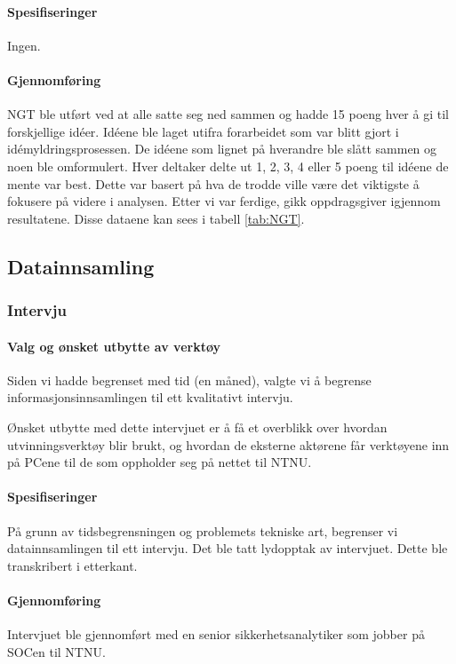 \paragraph{Spesifiseringer}
Ingen.

\paragraph{Gjennomføring}
NGT ble utført ved at alle satte seg ned sammen og hadde 15 poeng hver å gi til forskjellige idéer. Idéene ble laget utifra forarbeidet som var blitt gjort i idémyldringsprosessen. De idéene som lignet på hverandre ble slått sammen og noen ble omformulert. Hver deltaker delte ut 1, 2, 3, 4 eller 5 poeng til idéene de mente var best. Dette var basert på hva de trodde ville være det viktigste å fokusere på videre i analysen. Etter vi var ferdige, gikk oppdragsgiver igjennom resultatene. Disse dataene kan sees i tabell \ref{tab:NGT}.

\subsection{Datainnsamling}
\subsubsection{Intervju}

\paragraph{Valg og ønsket utbytte av verktøy}
Siden vi hadde begrenset med tid (en måned), valgte vi å begrense informasjonsinnsamlingen til ett kvalitativt intervju. 

Ønsket utbytte med dette intervjuet er å få et overblikk over hvordan utvinningsverktøy blir brukt, og hvordan de eksterne aktørene får verktøyene inn på PCene til de som oppholder seg på nettet til NTNU.

\paragraph{Spesifiseringer}
På grunn av tidsbegrensningen og problemets tekniske art, begrenser vi datainnsamlingen til ett intervju.
Det ble tatt lydopptak av intervjuet. Dette ble transkribert i etterkant. 

\paragraph{Gjennomføring}
Intervjuet ble gjennomført med en senior sikkerhetsanalytiker som jobber på SOCen til NTNU. 

